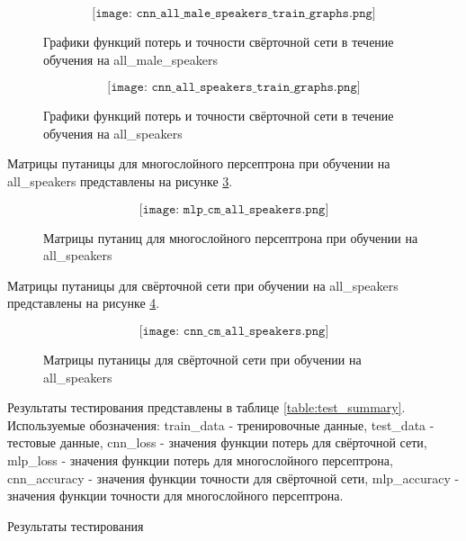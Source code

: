 \begin{figure}[H]
	\[\texttt{[image: cnn\_all\_male\_speakers\_train\_graphs.png]}\]
	\caption{Графики функций потерь и точности свёрточной сети в течение обучения на all\_male\_speakers}
	\label{fig:cnn_all_male_speakers_train_graphs}
\end{figure}

\begin{figure}[H]
	\[\texttt{[image: cnn\_all\_speakers\_train\_graphs.png]}\]
	\caption{Графики функций потерь и точности свёрточной сети в течение обучения на all\_speakers}
	\label{fig:cnn_all_speakers_train_graphs}
\end{figure}

\newpage
Матрицы путаницы для многослойного персептрона при обучении на all\_speakers представлены на рисунке \ref{fig:mlp_cm_all_speakers}.

\begin{figure}[H]
	\[\texttt{[image: mlp\_cm\_all\_speakers.png]}\]
	\caption{Матрицы путаниц для многослойного персептрона при обучении на all\_speakers}
	\label{fig:mlp_cm_all_speakers}
\end{figure}

\newpage
Матрицы путаницы для свёрточной сети при обучении на all\_speakers представлены на рисунке \ref{fig:cnn_cm_all_speakers}.

\begin{figure}[H]
	\[\texttt{[image: cnn\_cm\_all\_speakers.png]}\]
	\caption{Матрицы путаницы для свёрточной сети при обучении на all\_speakers}
	\label{fig:cnn_cm_all_speakers}
\end{figure}

\newpage
Результаты тестирования представлены в таблице \ref{table:test_summary}. Используемые обозначения: train\_data - тренировочные данные, test\_data - тестовые данные, cnn\_loss - значения функции потерь для свёрточной сети, mlp\_loss - значения функции потерь для многослойного персептрона, cnn\_accuracy - значения функции точности для свёрточной сети, mlp\_accuracy - значения функции точности для многослойного персептрона.

\begin{table}[H]
\small
\centering
{}
\caption{Результаты тестирования}
\label{table:test_summary}
\end{table}